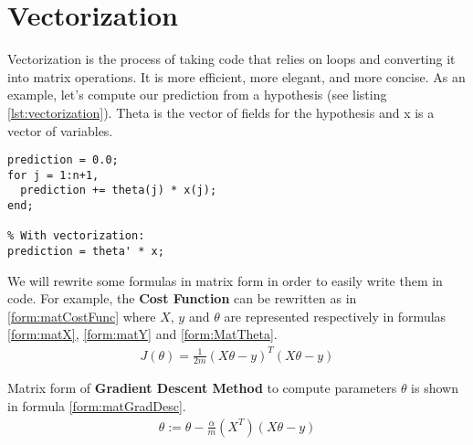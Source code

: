 \section{Vectorization}
Vectorization is the process of taking code that relies on loops and converting it into matrix operations. It is more efficient, more elegant, and more concise.
As an example, let's compute our prediction from a hypothesis (see listing \ref{lst:vectorization}). Theta is the vector of fields for the hypothesis and x is a vector of variables.
\begin{lstlisting}[label=lst:vectorization, caption=Vectorization Example]
% With loops:
prediction = 0.0;
for j = 1:n+1,
  prediction += theta(j) * x(j);
end;

% With vectorization:
prediction = theta' * x;
\end{lstlisting}
We will rewrite some formulas in matrix form in order to easily write them in code. For example, the \textbf{Cost Function} can be rewritten as in \eqref{form:matCostFunc} where $X$, $y$ and $\theta$ are represented respectively in formulas \eqref{form:matX}, \eqref{form:matY} and \eqref{form:MatTheta}.
\begin{align} \label{form:matCostFunc}
J(\theta) = \frac{1}{2m} (X\theta - y)^T(X\theta - y)
\end{align}

Matrix form of \textbf{Gradient Descent Method} to compute parameters $\theta$ is shown in formula \eqref{form:matGradDesc}.
\begin{align} \label{form:matGradDesc}
\theta := \theta - \frac{\alpha}{m}(X^T)(X\theta - y)
\end{align}
